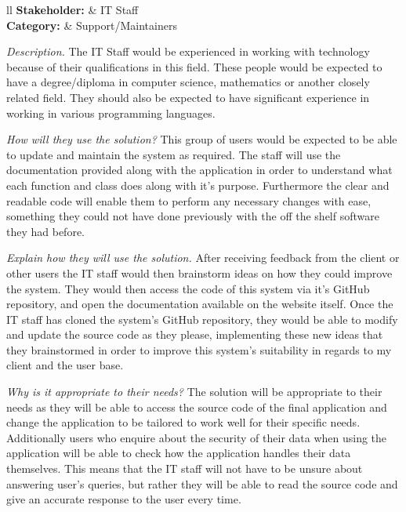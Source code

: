 \noindent
\begin{tblr}{ll}
  \textsf{\bfseries Stakeholder: } & IT Staff\\
  \textsf{\bfseries Category: } & Support/Maintainers\\
\end{tblr}
\vspace{0.2cm}

\textit{Description.}
The IT Staff would be experienced in working with technology
because of their qualifications in this field. These people
would be expected to have a degree/diploma in computer science,
mathematics or another closely related field. They should also
be expected to have significant experience in working in
various programming languages. \vspace{0.2cm}

\textit{How will they use the solution?}
This group of users would be expected to be able to update and
maintain the system as required. The staff will use the
documentation provided along with the application in order to
understand what each function and class does along with it's
purpose. Furthermore the clear and readable code will enable
them to perform any necessary changes with ease, something
they could not have done previously with the off the shelf
software they had before. \vspace{0.2cm}

\textit{Explain how they will use the solution.}
After receiving feedback from the client or other users the
IT staff would then brainstorm ideas on how they could
improve the system. They would then access the code of this
system via it's GitHub repository, and open the documentation
available on the website itself. Once the IT staff has cloned
the system's GitHub repository, they would be able to modify
and update the source code as they please, implementing these
new ideas that they brainstormed in order to improve this
system's suitability in regards to my client and the user base.
\vspace{0.2cm}

\textit{Why is it appropriate to their needs?}
The solution will be appropriate to their needs as they will be
able to access the source code of the final application and
change the application to be tailored to work well for their
specific needs. Additionally users who enquire about the
security of their data when using the application will be able
to check how the application handles their data themselves.
This means that the IT staff will not have to be unsure about
answering user's queries, but rather they will be able to read
the source code and give an accurate response to the user every
time.

